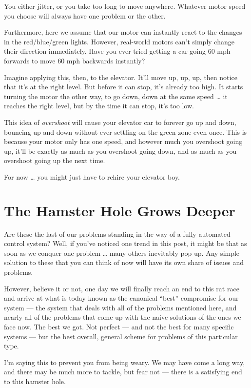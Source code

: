 \documentclass[]{article}
\begin{document}
You either jitter, or you take too long to move anywhere. Whatever motor speed
you choose will always have one problem or the other.

Furthermore, here we assume that our motor can instantly react to the changes in
the red/blue/green lights. However, real-world motors can't simply change their
direction immediately. Have you ever tried getting a car going 60 mph forwards
to move 60 mph backwards instantly?

Imagine applying this, then, to the elevator. It'll move up, up, up, then notice
that it's at the right level. But before it can stop, it's already too high. It
starts turning the motor the other way, to go down, down at the same speed
\ldots{} it reaches the right level, but by the time it can stop, it's too low.

This idea of \emph{overshoot} will cause your elevator car to forever go up and
down, bouncing up and down without ever settling on the green zone even once.
This is because your motor only has one speed, and however much you overshoot
going up, it'll be exactly as much as you overshoot going down, and as much as
you overshoot going up the next time.

For now \ldots{} you might just have to rehire your elevator boy.

\hypertarget{the-hamster-hole-grows-deeper}{%
\section{The Hamster Hole Grows Deeper}\label{the-hamster-hole-grows-deeper}}

Are these the last of our problems standing in the way of a fully automated
control system? Well, if you've noticed one trend in this post, it might be that
as soon as we conquer one problem \ldots{} many others inevitably pop up. Any
simple solution to these that you can think of now will have its own share of
issues and problems.

However, believe it or not, one day we will finally reach an end to this rat
race and arrive at what is today known as the canonical ``best'' compromise for
our system --- the system that deals with all of the problems mentioned here,
and nearly all of the problems that come up with the naive solutions of the ones
we face now. The best we got. Not perfect --- and not the best for many specific
systems --- but the best overall, general scheme for problems of this particular
type.

I'm saying this to prevent you from being weary. We may have come a long way,
and there may be much more to tackle, but fear not --- there is a satisfying end
to this hamster hole.
\end{document}
